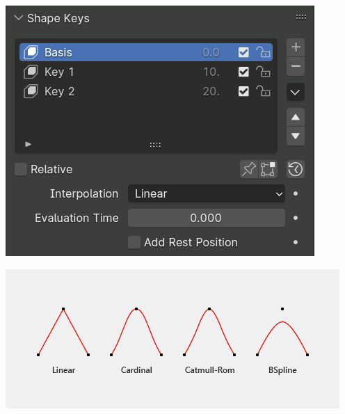 \documentclass{article}
\begin{document}
\begin{center}
    \begin{minipage}{0.45\textwidth}
        \centering
        \includegraphics[width=\textwidth]{blender_docs_images/animation_shape-keys_shape-keys-panel_absolute.png}
    \end{minipage}
    \hfill
    \begin{minipage}{0.45\textwidth}
        \centering
        \includegraphics[width=\textwidth]{blender_docs_images/animation_shape-keys_shape-keys-panel_interpolation-types.png}
    \end{minipage}
\end{center}
\end{document}
